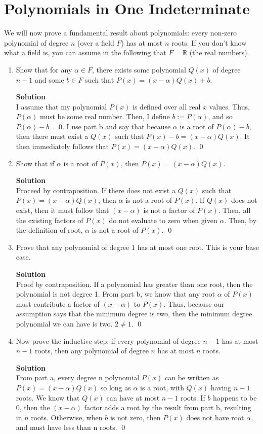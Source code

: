 \documentclass[11pt]{article}
\newcommand*{\Question}[1]{\section{#1}}
\newenvironment{Parts}{\begin{enumerate}[label=(\alph*)]}{\end{enumerate}}
\newcommand*{\Part}{\item}
\begin{document}
\Question{Polynomials in One Indeterminate}

We will now prove a fundamental result about polynomials: every non-zero
polynomial of degree $n$ (over a field $F$) has at most $n$ roots. If
you don't know what a field is, you can assume in the following that
$F = \mathbb{R}$ (the real numbers).
\begin{Parts}
    \Part Show that for any $\alpha \in F$, there exists some polynomial $Q(x)$
    of degree $n-1$ and some $b \in F$ such that $P(x) = (x-\alpha)Q(x) + b$.
\begin{mdframed} \textbf{Solution} \\
I assume that my polynomial $P(x)$ is defined over all real $x$ values. Thus, $P(\alpha)$ must be some real number. Then, I define $b:=P(\alpha)$, and so $P(\alpha)-b=0$. I use part b and say that because $\alpha$ is a root of $P(\alpha)-b$, then there must exist a $Q(x)$ such that $P(x)-b=(x-\alpha)Q(x)$. It then immediately follows that $P(x)=(x-\alpha)Q(x)$. \qed
\end{mdframed}

    \Part Show that if $\alpha$ is a root of $P(x)$, then $P(x) =
    (x-\alpha)Q(x)$.
\begin{mdframed} \textbf{Solution} \\
Proceed by contraposition. If there does not exist a $Q(x)$ such that $P(x)=(x-\alpha)Q(x)$, then $\alpha$ is not a root of $P(x)$. If $Q(x)$ does not exist, then it must follow that $(x-\alpha)$ is not a factor of $P(x)$. Then, all the existing factors of $P(x)$ do not evaluate to zero when given $\alpha$. Then, by the definition of root, $\alpha$ is not a root of $P(x)$. \qed
\end{mdframed}

    \Part Prove that any polynomial of degree $1$ has at most one
    root. This is your base case.
\begin{mdframed} \textbf{Solution} \\
Proof by contraposition. If a polynomial has greater than one root, then the polynomial is not degree 1. From part b, we know that any root $\alpha$ of $P(x)$ must contribute a factor of $(x-\alpha)$ to $P(x)$. Thus, because our assumption says that the minimum degree is two, then the minimum degree polynomial we can have is two. $2 \neq 1$. \qed
\end{mdframed}

    \Part Now prove the inductive step: if every polynomial of degree
    $n-1$ has at most $n-1$ roots, then any polynomial of degree $n$ has
    at most $n$ roots.
\begin{mdframed} \textbf{Solution} \\
From part a, every degree n polynomial $P(x)$ can be written as $P(x)=(x-\alpha)Q(x)$ so long as $\alpha$ is a root, with $Q(x)$ having $n-1$ roots. We know that $Q(x)$ can have at most $n-1$ roots. If $b$ happens to be 0, then the $(x-\alpha)$ factor adds a root by the result from part b, resulting in $n$ roots. Otherwise, when $b$ is not zero, then $P(x)$ does not have root $\alpha$, and must have less than n roots. \qed 
\end{mdframed}
\end{Parts}
\end{document}
